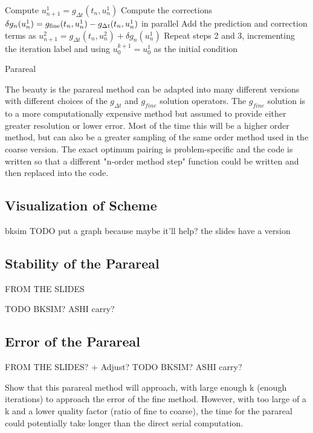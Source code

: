 \documentclass[letterpaper,twocolumn,11pt]{article}
\begin{document}
\begin{algorithm}[t]
    Compute $u^1_{n+1} = g_{\Delta t}(t_n, u^1_n)$\;
    Compute the corrections $\delta g_n(u^1_n) = g_{\textnormal{fine}}(t_n,
    u^1_n) - g_{\Delta t}(t_n, u^1_n)$ in parallel\;
    Add the prediction and correction terms as $u^2_{n+1} = g_{\Delta t}(t_n,
    u^2_n) + \delta g_n(u^1_n)$\;
    Repeat steps 2 and 3, incrementing the iteration label and using $u^{k+1}_0
    = u^1_0$ as the initial condition\;
 \caption{Parareal}
 \label{alg:parareal}
\end{algorithm}

The beauty is the parareal method can be adapted into many different versions with different choices of the $g_{\Delta t}$ and $g_{fine}$ solution operators.  The $g_{fine}$ solution is to a more computationally expensive method but assumed to provide either greater resolution or lower error.  Most of the time this will be a higher order method, but can also be a greater sampling of the same order method used in the coarse version.  The exact optimum pairing is problem-specific and the code is written so that a different "n-order method step" function could be written and then replaced into the code.

\subsection{Visualization of Scheme}

bksim TODO put a graph because maybe it'll help? the slides have a version

\subsection{Stability of the Parareal}

FROM THE SLIDES 

TODO BKSIM? ASHI carry?

\subsection{Error of the Parareal}

FROM THE SLIDES? + Adjust?
TODO BKSIM? ASHI carry?

Show that this parareal method will approach, with large enough k (enough iterations) to approach the error of the fine method.  However, with too large of a k and a lower quality factor (ratio of fine to coarse), the time for the parareal could potentially take longer than the direct serial computation.
\end{document}
